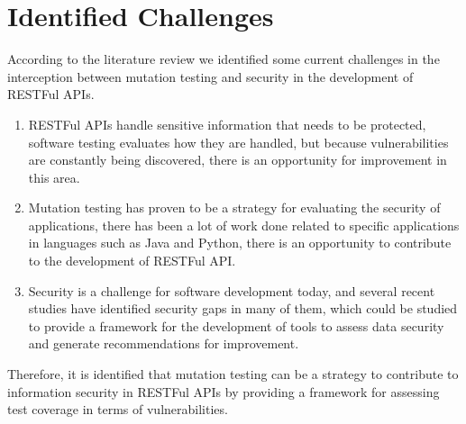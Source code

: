 \section{Identified Challenges}

According to the literature review we identified some current challenges in the interception between mutation testing and security in the development of RESTFul APIs.

\begin{enumerate}
    \item RESTFul APIs handle sensitive information that needs to be protected, software testing evaluates how they are handled, but because vulnerabilities are constantly being discovered, there is an opportunity for improvement in this area.
    \item Mutation testing has proven to be a strategy for evaluating the security of applications, there has been a lot of work done related to specific applications in languages such as Java and Python, there is an opportunity to contribute to the development of RESTFul API.
    \item Security is a challenge for software development today, and several recent studies have identified security gaps in many of them, which could be studied to provide a framework for the development of tools to assess data security and generate recommendations for improvement.
\end{enumerate}

Therefore, it is identified that mutation testing can be a strategy to contribute to information security in RESTFul APIs by providing a framework for assessing test coverage in terms of vulnerabilities.
